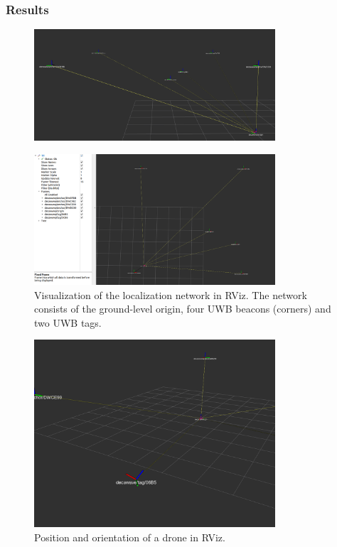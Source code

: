 \documentclass[12pt]{article}
\begin{document}
\subsubsection*{Results}
\begin{figure}[h]
    \centering
    \includegraphics[width=0.8\textwidth]{figures/image1.png}
    \label{fig:frames1}
\end{figure}
\begin{figure}[h]
    \centering
    \includegraphics[width=0.8\textwidth]{figures/image.png}
    \caption{Visualization of the localization network in RViz. The network consists of the ground-level origin, four UWB beacons (corners) and two UWB tags.}
    \label{fig:frames2}
\end{figure}
\begin{figure}[h]
    \centering
    \includegraphics[width=0.8\textwidth]{figures/image2.png}
    \caption{Position and orientation of a drone in RViz.}
    \label{fig:frames3}
\end{figure}
\end{document}
